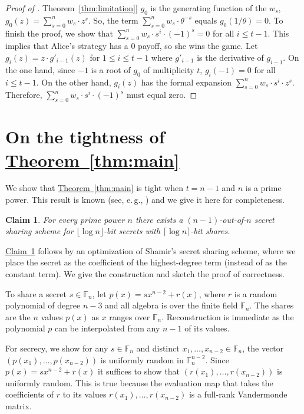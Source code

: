\documentclass[11pt]{article}
\numberwithin{equation}{section}
\newtheorem{claim}[theorem]{Claim}
\theoremstyle{definition}
\theoremstyle{plain}
\newcommand{\eg}{e.\,g.}
\newcommand{\expref}[2]{\hyperref[#2]{#1~\ref{#2}}}
\newcommand\F{\mathbb F}
\begin{document}
\begin{proof}[Proof of \expref{Theorem}{thm:limitation}]
$g_0$ is the generating function of 
the  %
$w_s$, $g_0(z) =
\sum^n_{s=0} w_s \cdot z^s$. So, the term $\sum_{s=0}^n w_s \cdot \theta^{-s}$
equals $g_0(1/\theta) = 0$.  To finish the proof, we show that $\sum_{s=0}^n w_s
	\cdot s^i \cdot (-1)^s = 0$ for all $i \leq t - 1$. This implies that Alice's
	strategy has a 0 payoff, so she wins the game.  Let $g_i(z) =
	z\cdot g'_{i-1}(z)$ for $1 \leq i \leq t - 1$ where $g'_{i-1}$ is the derivative
	of $g_{i-1}$.  On the one hand, since $-1$ is a root of $g_0$ of multiplicity
	$t$, $g_i(-1) = 0$ for all $i \leq t - 1$.  On the other hand, $g_i(z)$ has the
	formal expansion $\sum_{s=0}^n w_s \cdot s^i \cdot z^s$.  Therefore,
	$\sum_{s=0}^n w_s \cdot s^i \cdot (-1)^s$ must equal zero.
\end{proof}

\section{On the tightness of \expref{Theorem}{thm:main}}
\label{sec:shamir}

We show that \expref{Theorem}{thm:main} is tight when $t = n - 1$ and $n$ is
a prime power. This result is known (see, \eg, \cite[Theorem 11.13]{CDN2015})
and we give it here for completeness.

\begin{claim}
	\label{claim:shamiropt}
For every prime power $n$ 
there exists a $(n-1)$-out-of-$n$ secret sharing scheme for 
$\lfloor \log n\rfloor $-bit secrets with $\lceil \log n\rceil $-bit shares.
\end{claim}

\expref{Claim}{claim:shamiropt} follows by an optimization 
of Shamir's secret sharing scheme, where we place the secret as
the coefficient of the highest-degree term (instead of as the constant term).  We give the construction and sketch the 
proof of correctness.

To share a secret $s \in \F_n$, let $p(x) = sx^{n-2} + r(x)$, where $r$ 
is a random polynomial of degree $n - 3$ and all algebra is over the 
finite field $\F_n$.  The shares are the $n$ values $p(x)$ as $x$ 
ranges over $\F_n$. Reconstruction is immediate as the polynomial 
$p$ can be interpolated from any $n - 1$ of its values.

%
For secrecy, we show for any $s \in \F_n$ and distinct $x_1,\dots,x_{n-2} \in \F_n$, the vector $(p(x_1), \dots, p(x_{n-2}))$ is uniformly random in $\F_n^{n-2}$.  Since $p(x) = sx^{n-2} + r(x)$ it suffices to show that $(r(x_1),\dots, r(x_{n-2}))$ is uniformly random.  This is true because the evaluation map that takes the coefficients of $r$ to  
its values $r(x_1),\dots, r(x_{n-2})$ is a full-rank Vandermonde matrix.
\end{document}
